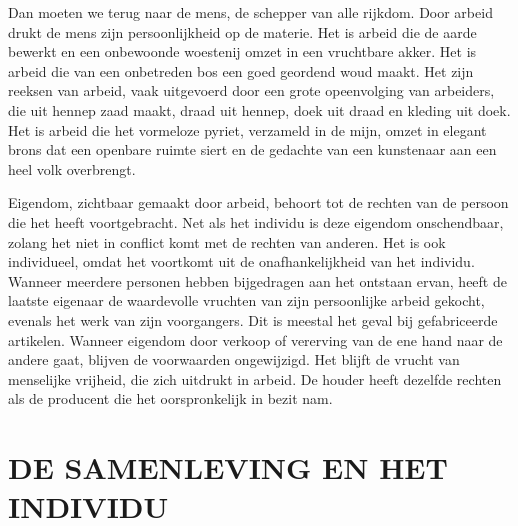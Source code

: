 \documentclass[
  a5paper,
  smalldemyvopaper,10pt,twoside,onecolumn,openright,extrafontsizes,hidelinks]{memoir}
\renewenvironment{quote}%
               {\list{}{\rightmargin=.6cm\leftmargin=.6cm}%
                \itshape \item[]}%
               {\endlist}
\begin{document}
\begin{quote}
Dan moeten we terug naar de mens, de schepper van alle rijkdom. Door
arbeid drukt de mens zijn persoonlijkheid op de materie. Het is arbeid
die de aarde bewerkt en een onbewoonde woestenij omzet in een vruchtbare
akker. Het is arbeid die van een onbetreden bos een goed geordend woud
maakt. Het zijn reeksen van arbeid, vaak uitgevoerd door een grote
opeenvolging van arbeiders, die uit hennep zaad maakt, draad uit hennep,
doek uit draad en kleding uit doek. Het is arbeid die het vormeloze
pyriet, verzameld in de mijn, omzet in elegant brons dat een openbare
ruimte siert en de gedachte van een kunstenaar aan een heel volk
overbrengt.

Eigendom, zichtbaar gemaakt door arbeid, behoort tot de rechten van de
persoon die het heeft voortgebracht. Net als het individu is deze
eigendom onschendbaar, zolang het niet in conflict komt met de rechten
van anderen. Het is ook individueel, omdat het voortkomt uit de
onafhankelijkheid van het individu. Wanneer meerdere personen hebben
bijgedragen aan het ontstaan ervan, heeft de laatste eigenaar de
waardevolle vruchten van zijn persoonlijke arbeid gekocht, evenals het
werk van zijn voorgangers. Dit is meestal het geval bij gefabriceerde
artikelen. Wanneer eigendom door verkoop of vererving van de ene hand
naar de andere gaat, blijven de voorwaarden ongewijzigd. Het blijft de
vrucht van menselijke vrijheid, die zich uitdrukt in arbeid. De houder
heeft dezelfde rechten als de producent die het oorspronkelijk in bezit
nam.
\end{quote}

\section{DE SAMENLEVING EN HET
INDIVIDU}\label{de-samenleving-en-het-individu}
\end{document}
